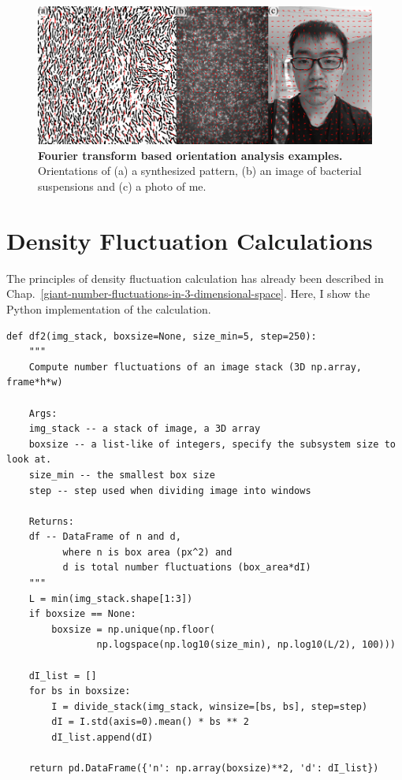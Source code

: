 \begin{figure}[h]
	\begin{center}
	\includegraphics[width=5.5in]{Figs/A-2/oft-gallery.pdf}
	\end{center}
	\caption[Fourier transform based orientation analysis examples]
	{
	\textbf{Fourier transform based orientation analysis examples.}
  Orientations of
  (a) a synthesized pattern,
  (b) an image of bacterial suspensions and
  (c) a photo of me.
	}
	\label{fig:oft-gallery}
\end{figure}

\section{Density Fluctuation Calculations}
\label{sec:A-df-calculation}
The principles of density fluctuation calculation has already been described in Chap.~\ref{giant-number-fluctuations-in-3-dimensional-space}. Here, I show the Python implementation of the calculation.

\begin{verbatim}
def df2(img_stack, boxsize=None, size_min=5, step=250):
    """
    Compute number fluctuations of an image stack (3D np.array, frame*h*w)

    Args:
    img_stack -- a stack of image, a 3D array
    boxsize -- a list-like of integers, specify the subsystem size to look at.
    size_min -- the smallest box size
    step -- step used when dividing image into windows

    Returns:
    df -- DataFrame of n and d,
          where n is box area (px^2) and
          d is total number fluctuations (box_area*dI)
    """
    L = min(img_stack.shape[1:3])
    if boxsize == None:
        boxsize = np.unique(np.floor(
                np.logspace(np.log10(size_min), np.log10(L/2), 100)))

    dI_list = []
    for bs in boxsize:
        I = divide_stack(img_stack, winsize=[bs, bs], step=step)
        dI = I.std(axis=0).mean() * bs ** 2
        dI_list.append(dI)

    return pd.DataFrame({'n': np.array(boxsize)**2, 'd': dI_list})
\end{verbatim}
